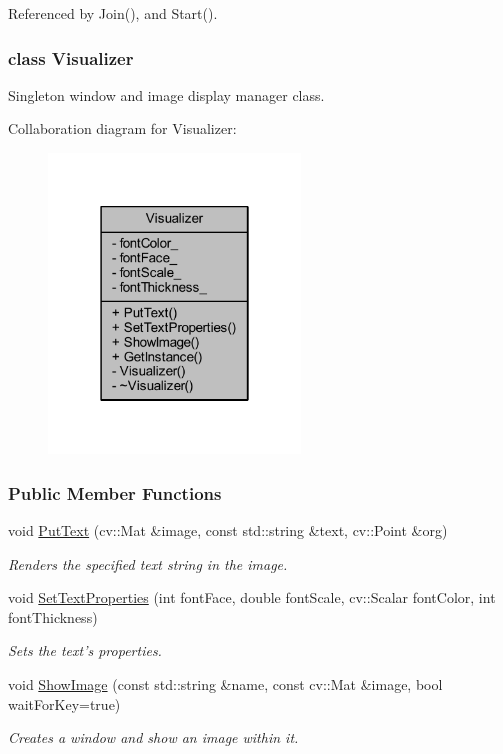 Referenced by Join(), and Start().

\label{class_visualizer}
\hypertarget{group___core_class_visualizer}{}
\subsubsection{class Visualizer}
Singleton window and image display manager class. 

Collaboration diagram for Visualizer\-:
\nopagebreak
\begin{figure}[H]
\begin{center}
\leavevmode
\includegraphics[width=190pt]{class_visualizer__coll__graph}
\end{center}
\end{figure}
\subsubsection*{Public Member Functions}
\begin{DoxyCompactItemize}
\item 
void \hyperlink{group___core_a0287f07ff905b861c4ce10a9af90d9f4}{Put\-Text} (cv\-::\-Mat \&image, const std\-::string \&text, cv\-::\-Point \&org)
\begin{DoxyCompactList}\small\item\em Renders the specified text string in the image. \end{DoxyCompactList}\item 
void \hyperlink{group___core_a51483ef2ff4337305b7ca06728eb3f1f}{Set\-Text\-Properties} (int font\-Face, double font\-Scale, cv\-::\-Scalar font\-Color, int font\-Thickness)
\begin{DoxyCompactList}\small\item\em Sets the text's properties. \end{DoxyCompactList}\item 
void \hyperlink{group___core_a910624091174d29faaa5c958215e1fd6}{Show\-Image} (const std\-::string \&name, const cv\-::\-Mat \&image, bool wait\-For\-Key=true)
\begin{DoxyCompactList}\small\item\em Creates a window and show an image within it. \end{DoxyCompactList}\end{DoxyCompactItemize}

